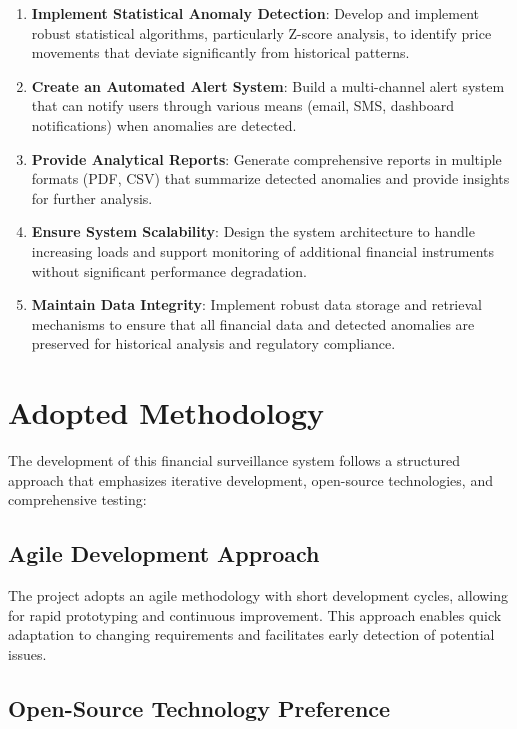 \begin{enumerate}
    \item \textbf{Implement Statistical Anomaly Detection}: Develop and implement robust statistical algorithms, particularly Z-score analysis, to identify price movements that deviate significantly from historical patterns.
    
    \item \textbf{Create an Automated Alert System}: Build a multi-channel alert system that can notify users through various means (email, SMS, dashboard notifications) when anomalies are detected.
    
    \item \textbf{Provide Analytical Reports}: Generate comprehensive reports in multiple formats (PDF, CSV) that summarize detected anomalies and provide insights for further analysis.
    
    \item \textbf{Ensure System Scalability}: Design the system architecture to handle increasing loads and support monitoring of additional financial instruments without significant performance degradation.
    
    \item \textbf{Maintain Data Integrity}: Implement robust data storage and retrieval mechanisms to ensure that all financial data and detected anomalies are preserved for historical analysis and regulatory compliance.
\end{enumerate}

\section{Adopted Methodology}

The development of this financial surveillance system follows a structured approach that emphasizes iterative development, open-source technologies, and comprehensive testing:

\subsection{Agile Development Approach}

The project adopts an agile methodology with short development cycles, allowing for rapid prototyping and continuous improvement. This approach enables quick adaptation to changing requirements and facilitates early detection of potential issues.

\subsection{Open-Source Technology Preference}

